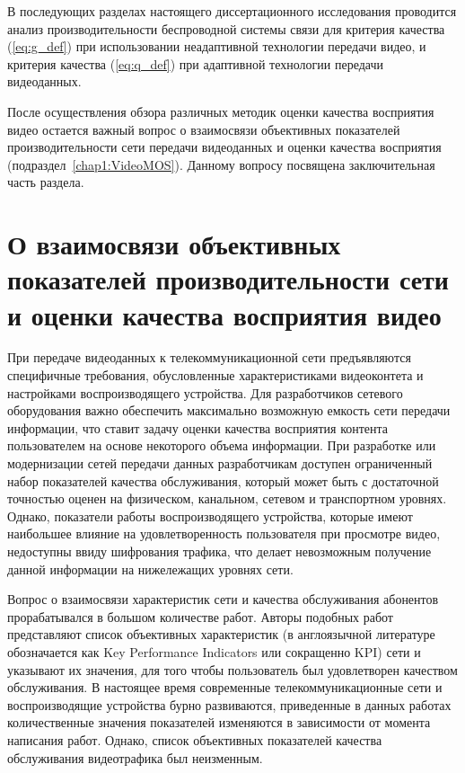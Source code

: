 В последующих разделах настоящего диссертационного исследования проводится анализ производительности беспроводной системы связи для критерия качества (\ref{eq:g_def}) при использовании неадаптивной технологии передачи видео, и критерия качества (\ref{eq:q_def}) при адаптивной технологии передачи видеоданных.

После осуществления обзора различных методик оценки качества восприятия видео остается важный вопрос о взаимосвязи объективных показателей производительности сети передачи видеоданных и оценки качества восприятия (подраздел~\ref{chap1:VideoMOS}). Данному вопросу посвящена заключительная часть раздела.

\section{О взаимосвязи объективных показателей производительности сети и оценки качества восприятия видео}
\label{chap1:InterrelationKPIandQoE}

При передаче видеоданных к телекоммуникационной сети предъявляются специфичные требования, обусловленные характеристиками видеоконтета и настройками воспроизводящего устройства. Для разработчиков сетевого оборудования важно обеспечить максимально возможную емкость сети передачи информации, что ставит задачу оценки качества восприятия контента пользователем на основе некоторого объема информации. При разработке или модернизации сетей передачи данных разработчикам доступен ограниченный набор показателей качества обслуживания, который может быть с достаточной точностью оценен на физическом, канальном, сетевом и транспортном уровнях. Однако, показатели работы воспроизводящего устройства, которые имеют наибольшее влияние на удовлетворенность пользователя при просмотре видео, недоступны ввиду шифрования трафика, что делает невозможным получение данной информации на нижележащих уровнях сети.

Вопрос о взаимосвязи характеристик сети и качества обслуживания абонентов прорабатывался в большом количестве работ. Авторы подобных работ представляют список объективных характеристик (в англоязычной литературе обозначается как Key Performance Indicators или сокращенно KPI) сети и указывают их значения, для того чтобы пользователь был удовлетворен качеством обслуживания. В настоящее время современные телекоммуникационные сети и воспроизводящие устройства бурно развиваются, приведенные в данных работах количественные значения показателей изменяются в зависимости от момента написания работ. Однако, список объективных показателей качества обслуживания видеотрафика был неизменным.


